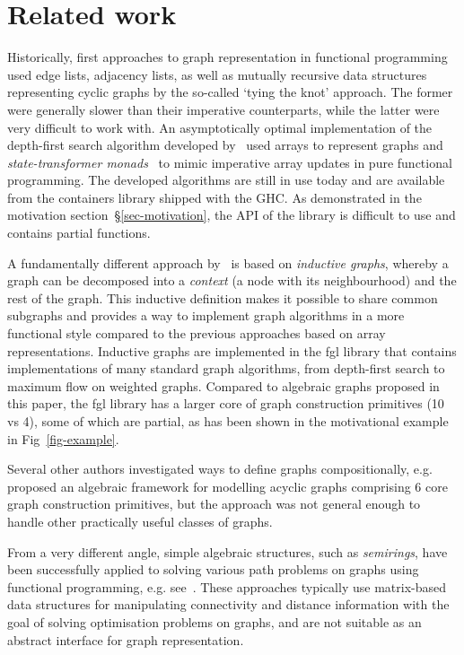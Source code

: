 \section{Related work}\label{sec-related}

Historically, first approaches to graph representation in functional programming
used edge lists, adjacency lists, as well as mutually recursive data structures
representing cyclic graphs by the so-called `tying the knot' approach. The former
were generally slower
than their imperative counterparts, while the latter were very difficult to
work with. An asymptotically optimal implementation of the depth-first search
algorithm developed by~\citet{1995_king_graphs} used arrays to represent graphs
and \emph{state-transformer monads}~\cite{1994_launchbury_st} to mimic imperative array
updates in pure functional programming. The developed algorithms are still in
use today and are available from the \textsf{containers} library shipped with the GHC.
As demonstrated in the motivation section~\S\ref{sec-motivation}, the API of
the library is difficult to use and contains partial functions.

A fundamentally different approach by~\citet{2001_erwig_inductive} is based
on \emph{inductive graphs}, whereby a graph can be decomposed into a \emph{context}
(a node with its neighbourhood) and the rest of the graph. This inductive
definition makes it possible to share common subgraphs and provides a way to
implement graph algorithms in a more functional style compared to the previous
approaches based on array representations. Inductive graphs are implemented in
the \textsf{fgl} library that contains implementations of many standard graph
algorithms, from depth-first search to maximum flow on weighted graphs. Compared
to algebraic graphs proposed in this paper, the \textsf{fgl} library has a larger
core of graph construction primitives (10 vs 4), some of which are partial, as
has been shown in the motivational example in Fig~\ref{fig-example}.

Several other authors investigated ways to define graphs compositionally,
e.g.~\citet{1995_gibbons_algebra} proposed an algebraic framework for modelling
acyclic graphs comprising 6 core graph construction primitives, but the approach
was not general enough to handle other practically useful classes of graphs.

From a very different angle, simple algebraic structures, such as \emph{semirings},
have been successfully applied to solving various path problems on graphs using
functional programming, e.g. see~\citet{2013_semirings_dolan}. These approaches
typically use matrix-based data structures for manipulating connectivity and distance
information with the goal of solving optimisation problems on graphs, and are not
suitable as an abstract interface for graph representation.

